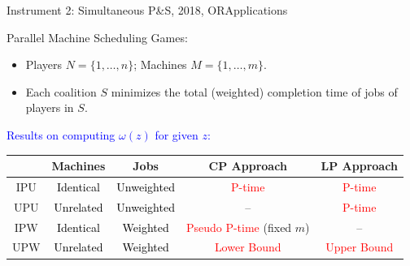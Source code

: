 \documentclass[14pt]{beamer}
\begin{document}
\begin{frame}{Instrument 2: Simultaneous P\&S, {\footnotesize 2018, OR}}{Applications}

{\small
Parallel Machine Scheduling Games:
\begin{itemize}
\small
	\item Players $N = \{1,\ldots,n\}$; Machines $M = \{1,\ldots,m\}$.
	\item Each coalition $S$ minimizes the total (weighted) completion time of jobs of players in $S$. %
\end{itemize}
\vspace{3pt}
\textcolor{blue}{Results on computing $\omega(z)$ for given $z$:}
\begin{table}[H]
\small
	\vspace{-5pt}
	\centering
	\tabcolsep=3pt
\footnotesize
	\renewcommand\arraystretch{1.35}
	\begin{tabular}[!h]{c c c c c}
		\hline
		\multicolumn{1}{c}{} &\multicolumn{1}{c}{Machines} &\multicolumn{1}{c}{Jobs}	&\multicolumn{1}{c}{CP Approach}	&\multicolumn{1}{c}{LP Approach}\\
		\hline
		IPU		&\textcolor{black}{Identical}		&\textcolor{black}{Unweighted} 	&\textcolor{red}{P-time}	&\textcolor{red}{P-time}\\
		
		UPU		&\textcolor{black}{Unrelated}	&\textcolor{black}{Unweighted}	&--	&\textcolor{red}{P-time}\\
		
		IPW		&\textcolor{black}{Identical}		&\textcolor{black}{Weighted}	&\textcolor{red}{Pseudo P-time} (fixed $m$)	&--		\\
		
		UPW		&\textcolor{black}{Unrelated}	&\textcolor{black}{Weighted}	&\textcolor{red}{Lower Bound}	&\textcolor{red}{Upper Bound}\\
		\hline
	\end{tabular}
\end{table}
}
\end{frame}
\end{document}
